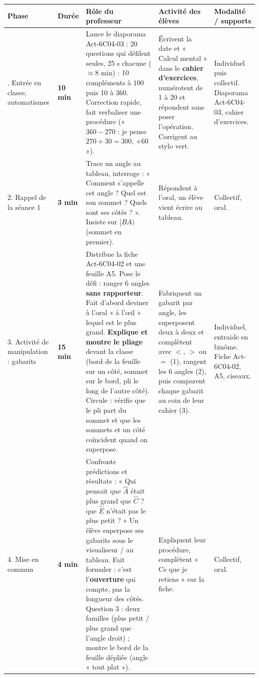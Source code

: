 \documentclass[11pt]{article}
\newcommand{\minutes}[1]{\textbf{#1 min}}
\begin{document}
\renewcommand{\arraystretch}{1.25}
\small
\begin{tabularx}{\linewidth}{|>{\raggedright\arraybackslash}p{2.1cm}|>{\centering\arraybackslash}p{0.9cm}|X|X|>{\raggedright\arraybackslash}p{2cm}|}
\hline
\textbf{Phase} & \textbf{Durée} & \textbf{Rôle du professeur} & \textbf{Activité des élèves} & \textbf{Modalité / supports} \\ \hline

1. Entrée en classe, automatismes &
\minutes{10} &
Lance le diaporama Act-6C04-03 : 20 questions qui défilent seules, 25 s chacune ($\approx 8$ min) : 10 compléments à $100$ puis 10 à $360$. Correction rapide, fait verbaliser une procédure (« $360 - 270$ : je pense $270 + 30 = 300$, $+ 60$ »). &
Écrivent la date et « Calcul mental » dans le \textbf{cahier d'exercices}, numérotent de 1 à 20 et répondent sans poser l'opération. Corrigent au stylo vert. &
Individuel puis collectif. Diaporama Act-6C04-03, cahier d'exercices. \\ \hline

2. Rappel de la séance 1 &
\minutes{3} &
Trace un angle au tableau, interroge : « Comment s'appelle cet angle ? Quel est son sommet ? Quels sont ses côtés ? ». Insiste sur $[BA)$ (sommet en premier). &
Répondent à l'oral, un élève vient écrire au tableau. &
Collectif, oral. \\ \hline

3. Activité de manipulation : gabarits &
\minutes{15} &
Distribue la fiche Act-6C04-02 et une feuille A5. Pose le défi : ranger 6 angles \textbf{sans rapporteur}. Fait d'abord deviner à l'oral « à l'œil » lequel est le plus grand. \textbf{Explique et montre le pliage} devant la classe (bord de la feuille sur un côté, sommet sur le bord, pli le long de l'autre côté). Circule : vérifie que le pli part du sommet et que les sommets et un côté coïncident quand on superpose. &
Fabriquent un gabarit par angle, les superposent deux à deux et complètent avec $<$, $>$ ou $=$ (1), rangent les 6 angles (2), puis comparent chaque gabarit au coin de leur cahier (3). &
Individuel, entraide en binôme. Fiche Act-6C04-02, A5, ciseaux. \\ \hline

4. Mise en commun &
\minutes{4} &
Confronte prédictions et résultats : « Qui pensait que $\widehat{A}$ était plus grand que $\widehat{C}$ ? que $\widehat{E}$ n'était pas le plus petit ? » Un élève superpose ses gabarits sous le visualiseur / au tableau. Fait formuler : c'est l'\textbf{ouverture} qui compte, pas la longueur des côtés. Question 3 : deux familles (plus petit / plus grand que l'angle droit) ; montre le bord de la feuille dépliée (angle « tout plat »). &
Expliquent leur procédure, complètent « Ce que je retiens » sur la fiche. &
Collectif, oral. \\ \hline


\end{tabularx}
\end{document}
